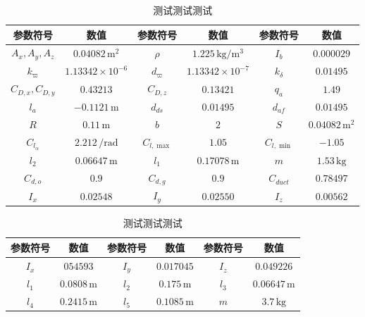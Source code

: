 \begin{table}
	\caption{\label{DF_p1}测试测试测试}
	\centering{}%
	\small 
	\begin{tabular}{cccccc}
		\hline 
		参数符号 & 数值&参数符号 & 数值&参数符号 & 数值\tabularnewline
		\hline 
		$ A_x,A_y,A_z $  & $ 0.04082\,\text{m}^2 $ &$ \rho $        &$1.225\,\text{kg}/\text{m}^3$&$ I_b $           & $ 0.000029 $               \tabularnewline
		$ k_{\varpi} $   & $1.13342 \times 10^{-6}$& $ d_{\varpi} $ & $1.13342 \times 10^{-7}$ 	  &$k_{\delta} $     & $ 0.01495 $ 			      \tabularnewline
		$C_{D,x},C_{D,y}$& $ 0.43213 $             &$ C_{D,z} $     & $ 0.13421 $             	  &	$ q_a $ 	     & $ 1.49 $ 				  \tabularnewline
		$ l_{a} $        & $ -0.1121\,\text{m} $   & $ d_{ds} $     & $ 0.01495 $			  	  &$ d_{af} $        & $ 0.01495 $    			  \tabularnewline
		$ R $            & $ 0.11\,\text{m} $      &$ b $           & $ 2 $       			   	  &$ S $ 			 & $ 0.04082\,\text{m}^2 $    \tabularnewline
		$C_{l_{\alpha}}$ & $ 2.212\,/\text{rad} $  &$C_{l, \max } $ & $ 1.05 $ 				   	  &$ C_{l, \min } $  & $ -1.05 $ 				  \tabularnewline
		$ l_2 $          & $ 0.06647\,\text{m} $   &$ l_1 $         & $ 0.17078\,\text{m} $    	  &	$ m $ 		     & $ 1.53\,\text{kg} $ 		  \tabularnewline
		$ C_{d, o } $    & $ 0.9 $                 &$ C_{d, g } $   & $ 0.9 $					  &$ C_{duct} $      & $ 0.78497 $	 			  \tabularnewline
		$ I_x $          & $ 0.02548 $ 			   &$ I_y $         & $ 0.02550 $                 &$ I_z $			 & $ 0.00562 $ 				  \tabularnewline
		\hline 
	\end{tabular}	
\end{table}

\begin{table}
	\caption{\label{TDF_p2}测试测试测试}
	\centering{}%
	\small 
	\begin{tabular}{cccccc}
		\hline 
		参数符号 & 数值&参数符号 & 数值&参数符号 & 数值\tabularnewline
		\hline 
		$ I_x $ & $ 054593 $ &$ I_y $ & $ 0.017045 $& $ I_z$ & $ 0.049226 $ \tabularnewline
		$ l_{1} $ & $ 0.0808\,\text{m} $&$ l_{2} $ & $ 0.175\,\text{m} $ &$ l_3 $ & $ 0.06647\,\text{m} $ \tabularnewline 
		$ l_4 $ & $ 0.2415\,\text{m} $ &$ l_5 $ & $ 0.1085\,\text{m} $& $ m $ & $ 3.7\,\text{kg} $ \tabularnewline
		\hline 
	\end{tabular}	%
\end{table}